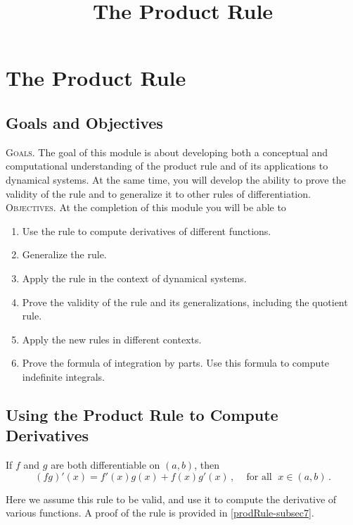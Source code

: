 \documentclass{ximera}
\title{The Product Rule}
\begin{document}
\maketitle
 
 \setcounter{chapter}{3}
\setcounter{section}{1}
\section{The Product Rule}
\subsection*{Goals and Objectives}

\textsc{Goals.} The goal of this module is about developing both a conceptual and computational understanding of the product rule and of its applications to dynamical systems. At the same time, you will develop the ability to prove the validity of the rule and to generalize it to other rules of differentiation.
\\

\noindent \textsc{Objectives.} At the completion of this module you will be able to
\begin{enumerate}
\item Use the rule to compute derivatives of different functions.
\item Generalize the rule.
\item Apply the rule in the context of dynamical systems.
\item Prove the validity of the rule and its generalizations, including the quotient rule.
\item Apply the new rules in different contexts.
\item Prove the formula of integration by parts. Use this formula to compute indefinite integrals.
\end{enumerate}

\subsection{Using the Product Rule to Compute Derivatives}\label{prodRule-subsec1}

\begin{theorem} If \(f\) and \(g\) are both differentiable on \((a,b)\), then
 \[(f g)'(x)= f'(x) g(x)+ f(x) g'(x)\,,  \;\;\;  \text{ for all } \; x \in (a,b)\,.\]
\end{theorem}
Here we assume this rule to be valid, and use it to compute the derivative of various functions. A proof of the rule is provided in \ref{prodRule-subsec7}.
\end{document}
